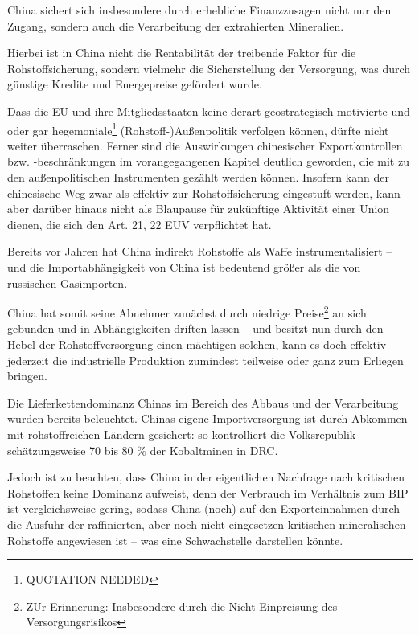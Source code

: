 \documentclass[12pt,a4paper,oneside]{book} %
\begin{document}
China sichert sich insbesondere durch erhebliche Finanzzusagen nicht nur den Zugang, sondern auch die Verarbeitung der extrahierten Mineralien.

Hierbei ist in China nicht die Rentabilität der treibende Faktor für die Rohstoffsicherung, sondern vielmehr die Sicherstellung der Versorgung, was durch günstige Kredite und Energepreise gefördert wurde.\autocite{Oxford Analytica: Critical minerals will be a global faultline for years}


Dass die EU und ihre Mitgliedsstaaten keine derart geostrategisch motivierte und oder gar hegemoniale\footnote{QUOTATION NEEDED} (Rohstoff-)Außenpolitik verfolgen können, dürfte nicht weiter überraschen. Ferner sind die Auswirkungen chinesischer Exportkontrollen bzw. -beschränkungen im vorangegangenen Kapitel deutlich geworden, die mit zu den außenpolitischen Instrumenten gezählt werden können. Insofern kann der chinesische Weg zwar als effektiv zur Rohstoffsicherung eingestuft werden, kann aber darüber hinaus nicht als Blaupause für zukünftige Aktivität einer Union dienen, die sich den Art. 21, 22 EUV verpflichtet hat.

Bereits vor Jahren hat China indirekt Rohstoffe als Waffe instrumentalisiert -- und die Importabhängigkeit von China ist bedeutend größer als die von russischen Gasimporten.\autocite{BDI. Rohstoffkongress: Deutschland braucht eine strategische Rohstoffpolitik}

China hat somit seine Abnehmer zunächst durch niedrige Preise\footnote{ZUr Erinnerung: Insbesondere durch die Nicht-Einpreisung des Versorgungsrisikos} an sich gebunden und in Abhängigkeiten driften lassen -- und besitzt nun durch den Hebel der Rohstoffversorgung einen mächtigen solchen, kann es doch effektiv jederzeit die industrielle Produktion zumindest teilweise oder ganz zum Erliegen bringen.

Die Lieferkettendominanz Chinas im Bereich des Abbaus und der Verarbeitung wurden bereits beleuchtet. Chinas eigene Importversorgung ist durch Abkommen mit rohstoffreichen Ländern gesichert: so kontrolliert die Volksrepublik schätzungsweise 70 bis 80 \% der Kobaltminen in DRC.

Jedoch ist zu beachten, dass China in der eigentlichen Nachfrage nach kritischen Rohstoffen keine Dominanz aufweist, denn der Verbrauch im Verhältnis zum BIP ist vergleichsweise gering, sodass China (noch) auf den Exporteinnahmen durch die Ausfuhr der raffinierten, aber noch nicht eingesetzen kritischen mineralischen Rohstoffe angewiesen ist -- was eine Schwachstelle darstellen könnte.
\end{document}
